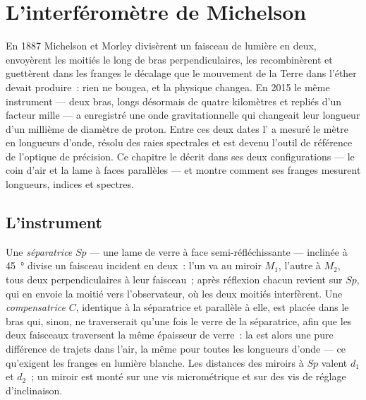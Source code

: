 \chapter{L'interféromètre de Michelson}\label{ch:b2:michelson}

En 1887 Michelson et Morley divisèrent un faisceau de lumière en deux, envoyèrent les
moitiés le long de bras perpendiculaires, les recombinèrent et guettèrent dans les
franges le décalage que le mouvement de la Terre dans l'éther devait
produire~: rien ne bougea, et la physique changea. En 2015 le même
instrument --- deux bras, longs désormais de quatre kilomètres et repliés d'un facteur
mille --- a enregistré une onde gravitationnelle qui changeait leur longueur
d'un millième de diamètre de proton. Entre ces deux dates l' a mesuré le mètre en longueurs d'onde, résolu des
raies spectrales et est devenu l'outil de référence de l'optique de précision.
Ce chapitre le décrit dans ses deux configurations --- le coin d'air
et la lame à faces parallèles --- et montre comment ses franges mesurent longueurs,
indices et spectres.

\section{L'instrument}

\begin{definition}\label{def:b2:michelson:instrument}
Une \emph{séparatrice} $Sp$ --- une lame de verre à face semi-réfléchissante
--- inclinée à \qty{45}{\degree} divise un faisceau incident en deux~: l'un va au
miroir $M_1$, l'autre à $M_2$, tous deux perpendiculaires à leur faisceau~; après
réflexion chacun revient sur $Sp$, qui en envoie la moitié vers
l'observateur, où les deux moitiés interfèrent. Une \emph{compensatrice}
$C$, identique à la séparatrice et parallèle à elle, est placée dans le bras
qui, sinon, ne traverserait qu'une fois le verre de la séparatrice, afin que les deux
faisceaux traversent la même épaisseur de verre~: la  est alors une
pure différence de trajets dans l'air, la même pour toutes les longueurs d'onde --- ce qu'exigent
les franges en lumière blanche. Les distances des miroirs à $Sp$ valent $d_1$
et $d_2$~; un miroir est monté sur une vis micrométrique et sur des vis
de réglage d'inclinaison.
\end{definition}

